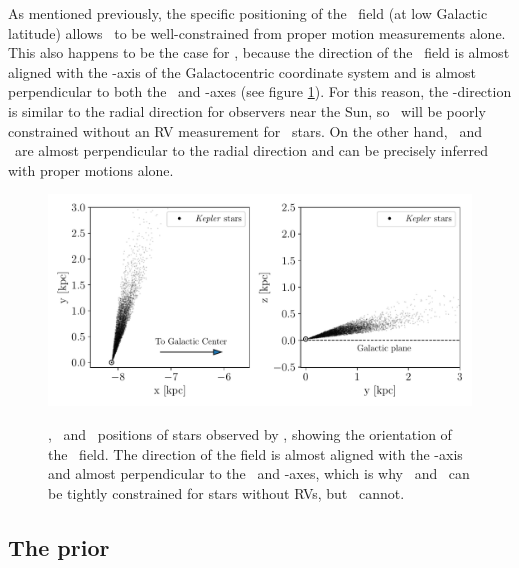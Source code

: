 As mentioned previously, the specific positioning of the \kepler\ field (at
low Galactic latitude) allows \vz\ to be well-constrained from proper motion
measurements alone.
This also happens to be the case for \vx, because the direction of the
\kepler\ field is almost aligned with the \y-axis of the Galactocentric
coordinate system and is almost perpendicular to both the \x\ and \z-axes (see
figure \ref{fig:kepler_field}).
For this reason, the \y-direction is similar to the radial direction for
observers near the Sun, so \vy\ will be poorly constrained without an RV
measurement for \kepler\ stars.
On the other hand, \vx\ and \vz\ are almost perpendicular to the radial
direction and can be precisely inferred with proper motions alone.
\begin{figure}[ht!]
\caption{
\x, \y\ and \z\ positions of stars observed by \kepler, showing the
    orientation of the \kepler\ field.
The direction of the field is almost aligned with the \y-axis and almost
    perpendicular to the \x\ and \z-axes, which is why \vx\ and \vz\ can be
    tightly constrained for stars without RVs, but \vy\ cannot.
}
  \centering
    \includegraphics[width=.7\textwidth]{kepler_field}
\label{fig:kepler_field}
\end{figure}

\subsection{The prior}
\label{sec:prior}

